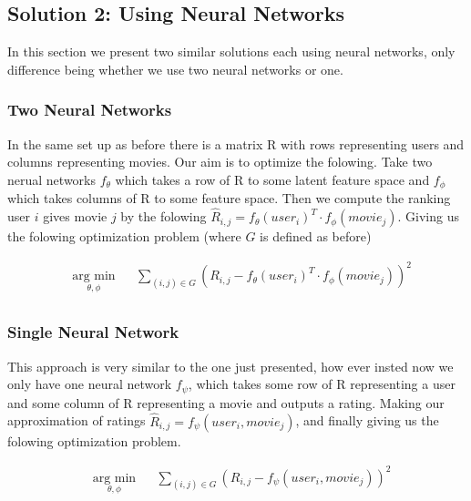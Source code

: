 \documentclass{article}
\begin{document}
\subsection{Solution 2: Using Neural Networks}

In this section we present two similar solutions each using neural networks, only difference being whether we use two neural networks or one.

\subsubsection{Two Neural Networks}
In the same set up as before there is a matrix R with rows representing users and columns representing movies. Our aim is to optimize the folowing. Take two nerual networks $f_{\theta}$ which takes a row of R to some latent feature space and $f_{\phi}$ which takes columns of R to some feature space. Then we compute the ranking user $i$ gives movie $j$ by the folowing $\hat{R}_{i,j} = f_{\theta}(user_i)^T \cdot f_{\phi}(movie_j)$. Giving us the folowing optimization problem (where $G$ is defined as before)

\begin{equation*}
\begin{aligned}
& \underset{\theta, \phi}{\text{arg min}}
& & \sum_{(i,j) \in G} (R_{i,j} - f_{\theta}(user_i)^T \cdot f_{\phi}(movie_j))^2  \\
\end{aligned}
\end{equation*}

\subsubsection{Single Neural Network}
This approach is very similar to the one just presented, how ever insted now we only have one neural network $f_{\psi}$, which takes some row of R representing a user and some column of R representing a movie and outputs a rating. Making our approximation of ratings $\hat{R}_{i,j} = f_{\psi}(user_i, movie_j)$, and finally giving us the folowing optimization problem.

\begin{equation*}
\begin{aligned}
& \underset{\theta, \phi}{\text{arg min}}
& & \sum_{(i,j) \in G} (R_{i,j} - f_{\psi}(user_i, movie_j))^2  \\
\end{aligned}
\end{equation*}
\end{document}
